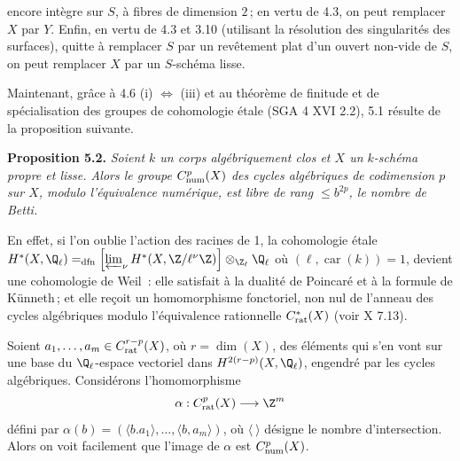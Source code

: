 encore int\`egre sur \(S\), \`a fibres de dimension \(2\)\,; en vertu de 4.3, on peut remplacer \(X\) par \(Y\). Enfin, en vertu de 4.3 et 3.10 (utilisant la r\'esolution des singularit\'es des surfaces), quitte \`a remplacer \(S\) par un rev\^etement plat d'un ouvert non-vide de \(S\), on peut remplacer \(X\) par un \(S\)-sch\'ema lisse.

Maintenant, gr\^ace \`a 4.6 (i) \(\Longleftrightarrow\) (iii) et au th\'eor\`eme de finitude et de sp\'ecialisation des groupes de cohomologie \'etale (SGA 4 XVI 2.2), 5.1 r\'esulte de la proposition suivante.

\textbf{Proposition 5.2.} \emph{Soient \(k\) un corps alg\'ebriquement clos et \(X\) un \(k\)-sch\'ema propre et lisse. Alors le groupe \(C^p_{\rm num}(X)\) des cycles alg\'ebriques de codimension \(p\) sur \(X\), modulo l'\'equivalence num\'erique, est libre de rang \(\le b^{2p}\), le nombre de Betti.}

En effet, si l'on oublie l'action des racines de 1, la cohomologie \'etale \(H^*(X,\Q_\ell)=_{\rm dfn}\left[\varprojlim_\nu H^*(X,\Z/\ell^\nu\Z)\right]\otimes_{\Z_\ell}\Q_\ell\) o\`u \((\ell,\operatorname{car}(k))=1\), devient une cohomologie de Weil~: elle satisfait \`a la dualit\'e de Poincar\'e et \`a la formule de K\"unneth\,; et elle re\c{c}oit un homomorphisme fonctoriel, non nul de l'anneau des cycles alg\'ebriques modulo l'\'equivalence rationnelle \(C^*_{\rm rat}(X)\) (voir X 7.13).

Soient \(a_1,\ldots,a_m\in C^{r-p}_{\rm rat}(X)\), o\`u \(r=\dim(X)\), des \'el\'ements qui s'en vont sur une base du \(\Q_\ell\)-espace vectoriel dans \(H^{2(r-p)}(X,\Q_\ell)\), engendr\'e par les cycles alg\'ebriques. Consid\'erons l'homomorphisme
\[
   \alpha:C^p_{\rm rat}(X)\longrightarrow \Z^m
\]
d\'efini par \(\alpha(b)=(\langle b.a_1\rangle,\ldots,\langle b,a_m\rangle)\), o\`u \(\langle\ \rangle\) d\'esigne le nombre d'intersection. Alors on voit facilement que l'image de \(\alpha\) est \(C^p_{\rm num}(X)\).

